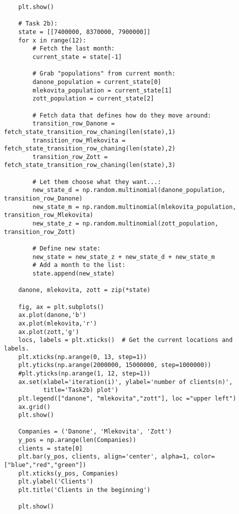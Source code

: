 \documentclass[a4paper]{article}
\begin{document}
\begin{lstlisting}
    plt.show()

    # Task 2b):
    state = [[7400000, 8370000, 7900000]]
    for x in range(12):
        # Fetch the last month:
        current_state = state[-1]

        # Grab "populations" from current month:
        danone_population = current_state[0]
        mlekovita_population = current_state[1]
        zott_population = current_state[2]

        # Fetch data that defines how do they move around:
        transition_row_Danone = fetch_state_transition_row_chaning(len(state),1)
        transition_row_Mlekovita = fetch_state_transition_row_chaning(len(state),2)
        transition_row_Zott = fetch_state_transition_row_chaning(len(state),3)

        # Let them choose what they want...:
        new_state_d = np.random.multinomial(danone_population, transition_row_Danone)
        new_state_m = np.random.multinomial(mlekovita_population, transition_row_Mlekovita)
        new_state_z = np.random.multinomial(zott_population, transition_row_Zott)

        # Define new state:
        new_state = new_state_z + new_state_d + new_state_m
        # Add a month to the list:
        state.append(new_state)

    danone, mlekovita, zott = zip(*state)

    fig, ax = plt.subplots()
    ax.plot(danone,'b')
    ax.plot(mlekovita,'r')
    ax.plot(zott,'g')
    locs, labels = plt.xticks()  # Get the current locations and labels.
    plt.xticks(np.arange(0, 13, step=1))
    plt.yticks(np.arange(2000000, 15000000, step=1000000))
    #plt.yticks(np.arange(1, 12, step=1))
    ax.set(xlabel='iteration(i)', ylabel='number of clients(n)',
           title='Task2b) plot')
    plt.legend(["danone", "mlekovita","zott"], loc ="upper left")
    ax.grid()
    plt.show()

    Companies = ('Danone', 'Mlekovita', 'Zott')
    y_pos = np.arange(len(Companies))
    clients = state[0]
    plt.bar(y_pos, clients, align='center', alpha=1, color=["blue","red","green"])
    plt.xticks(y_pos, Companies)
    plt.ylabel('Clients')
    plt.title('Clients in the beginning')

    plt.show()
\end{lstlisting}
\end{document}
